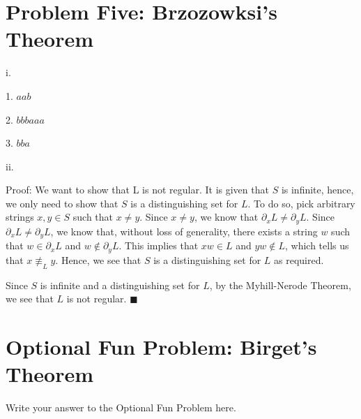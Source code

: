 \documentclass{article}
\renewcommand{\(}{\left(}
\renewcommand{\)}{\right)}
\renewcommand\qedsymbol{$\blacksquare$}
\theoremstyle{plain}
\theoremstyle{plain}
\theoremstyle{definition}
\begin{document}
\newpage

\section*{Problem Five: Brzozowksi's Theorem}
    i.
    \begin{shaded}
        1. $aab$
        
        \vspace*{4mm}

        2. $bbbaaa$

        \vspace*{4mm}

        3. $bba$
    \end{shaded}
    
    ii.
    \begin{shaded}
        Proof: We want to show that L is not regular. It is given that $S$ is infinite, hence, we only need to show that $S$ is a distinguishing set for $L$. To do so, pick arbitrary strings $x,y\in S$ such that $x\neq y$. Since $x\neq y$, we know that $\partial_x L\ne \partial_y L$. Since $\partial_x L\ne \partial_y L$, we know that, without loss of generality, there exists a string $w$ such that $w\in\partial_x L$ and $w\notin\partial_y L$. This implies that $xw\in L$ and $yw\notin L$, which tells us that $x\not\equiv_L y$. Hence, we see that $S$ is a distinguishing set for $L$ as required. 

        \vspace*{4mm}

        Since $S$ is infinite and a distinguishing set for $L$, by the Myhill-Nerode Theorem, we see that $L$ is not regular. \qedsymbol
    \end{shaded}

\newpage

\section*{Optional Fun Problem: Birget's Theorem}
\begin{shaded}
Write your answer to the Optional Fun Problem here.
\end{shaded}
\end{document}
